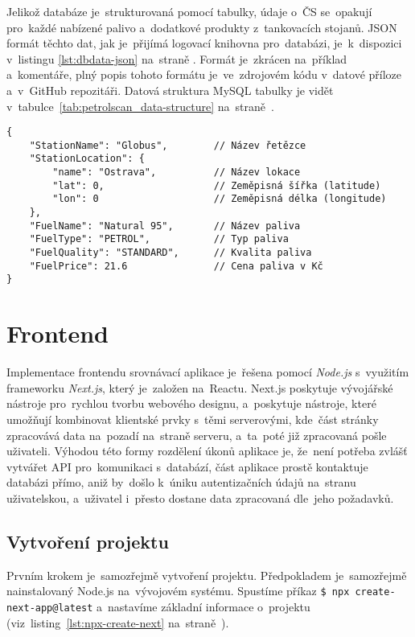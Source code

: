 Jelikož databáze je~strukturovaná pomocí tabulky, údaje o~ČS se~opakují
pro~každé nabízené palivo a~dodatkové produkty z~tankovacích stojanů.
JSON formát těchto dat, jak je~přijímá logovací knihovna pro~databázi,
je~k~dispozici v~listingu \ref{lst:dbdata-json}
na~straně \pageref{lst:dbdata-json}. Formát je~zkrácen na~příklad
a~komentáře, plný popis tohoto formátu je~ve~zdrojovém kódu v~datové příloze
a~v~GitHub repozitáři. Datová struktura MySQL tabulky je vidět
v~tabulce~\ref{tab:petrolscan_data-structure}
na~straně~\pageref{tab:petrolscan_data-structure}.

\begin{lstlisting}[caption={JSON formát dat pro logovací knihovnu},label=lst:dbdata-json]
{
    "StationName": "Globus",        // Název řetězce
    "StationLocation": {
        "name": "Ostrava",          // Název lokace
        "lat": 0,                   // Zeměpisná šířka (latitude)
        "lon": 0                    // Zeměpisná délka (longitude)
    },
    "FuelName": "Natural 95",       // Název paliva
    "FuelType": "PETROL",           // Typ paliva
    "FuelQuality": "STANDARD",      // Kvalita paliva
    "FuelPrice": 21.6               // Cena paliva v Kč
}
\end{lstlisting}

\section{Frontend}
\label{sec:development-frontend}

Implementace frontendu srovnávací aplikace je~řešena pomocí \emph{Node.js}
s~využitím frameworku \emph{Next.js}, který je~založen na~Reactu. Next.js
poskytuje vývojářské nástroje pro~rychlou tvorbu webového designu, a~poskytuje
nástroje, které umožňují kombinovat klientské prvky s~těmi serverovými,
kde~část stránky zpracovává data na~pozadí na~straně serveru, a~ta~poté již
zpracovaná pošle uživateli. Výhodou této formy rozdělení úkonů aplikace je,
že~není potřeba zvlášť vytvářet API pro~komunikaci s~databází, část aplikace
prostě kontaktuje databázi přímo, aniž by~došlo k~úniku autentizačních
údajů na~stranu uživatelskou, a~uživatel i~přesto dostane data zpracovaná
dle~jeho požadavků.

\subsection{Vytvoření projektu}

Prvním krokem je~samozřejmě vytvoření projektu. Předpokladem je~samozřejmě
nainstalovaný Node.js na~vývojovém systému. Spustíme příkaz
\texttt{\$ npx create-next-app@latest} a~nastavíme základní informace
o~projektu (viz~listing~\ref{lst:npx-create-next}
na~straně~\pageref{lst:npx-create-next}).

